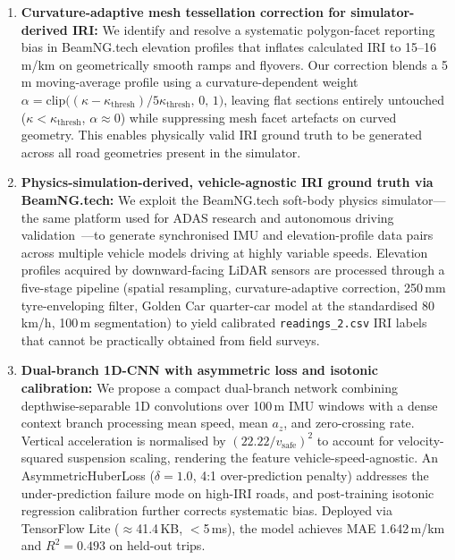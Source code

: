 \documentclass[conference]{IEEEtran}
\begin{document}
\begin{enumerate}
    \item \textbf{Curvature-adaptive mesh tessellation correction for simulator-derived IRI:} We identify and resolve a systematic polygon-facet reporting bias in BeamNG.tech elevation profiles that inflates calculated IRI to 15--16\,m/km on geometrically smooth ramps and flyovers.
Our correction blends a 5\,m moving-average profile using a curvature-dependent weight $\alpha = \text{clip}\bigl((\kappa - \kappa_{\text{thresh}}) / 5\kappa_{\text{thresh}},\, 0,\, 1\bigr)$, leaving flat sections entirely untouched ($\kappa < \kappa_{\text{thresh}}$, $\alpha \approx 0$) while suppressing mesh facet artefacts on curved geometry.
This enables physically valid IRI ground truth to be generated across all road geometries present in the simulator.

    \item \textbf{Physics-simulation-derived, vehicle-agnostic IRI ground truth via BeamNG.tech:} We exploit the BeamNG.tech soft-body physics simulator---the same platform used for ADAS research and autonomous driving validation~\cite{15}---to generate synchronised IMU and elevation-profile data pairs across multiple vehicle models driving at highly variable speeds.
Elevation profiles acquired by downward-facing LiDAR sensors are processed through a five-stage pipeline (spatial resampling, curvature-adaptive correction, 250\,mm tyre-enveloping filter, Golden Car quarter-car model at the standardised 80\,km/h, 100\,m segmentation) to yield calibrated \texttt{readings\_2.csv} IRI labels that cannot be practically obtained from field surveys.

    \item \textbf{Dual-branch 1D-CNN with asymmetric loss and isotonic calibration:} We propose a compact dual-branch network combining depthwise-separable 1D convolutions over 100\,m IMU windows with a dense context branch processing mean speed, mean $a_z$, and zero-crossing rate.
Vertical acceleration is normalised by $(22.22/v_{\text{safe}})^2$ to account for velocity-squared suspension scaling, rendering the feature vehicle-speed-agnostic.
An AsymmetricHuberLoss ($\delta=1.0$, 4:1 over-prediction penalty) addresses the under-prediction failure mode on high-IRI roads, and post-training isotonic regression calibration further corrects systematic bias.
Deployed via TensorFlow Lite ($\approx$41.4\,KB, $<$5\,ms), the model achieves MAE 1.642\,m/km and $R^{2} = 0.493$ on held-out trips.


\end{enumerate}
\end{document}
